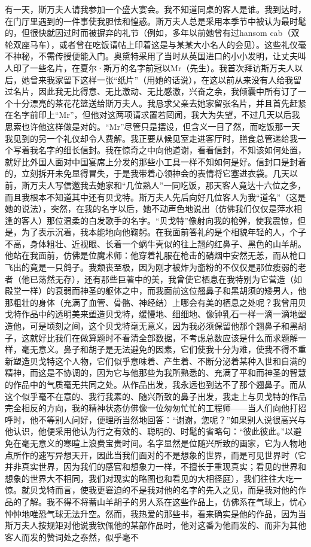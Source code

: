 \par 有一天，斯万夫人请我参加一个盛大宴会。我不知道同桌的客人是谁。我到达时，在门厅里遇到的一件事使我胆怯和惶惑。斯万夫人总是采用本季节中被认为最时髦的，但很快就因过时而被摒弃的礼节（例如，多年以前她曾有过hansom cab（双轮双座马车），或者曾在吃饭请帖上印着这是与某某大小名人的会见）。这些礼仪毫不神秘，不需传授便能入门。奥黛特采用了当时从英国进口的小小发明，让丈夫叫人印了一些名片，在夏尔·斯万的名字前冠以Mr（先生）。我首次拜访斯万夫人以后，她曾来我家留下这样一张“纸片”（用她的话说），在这以前从来没有人给我留过名片，因此我无比得意、无比激动、无比感激，兴奋之余，我倾囊中所有订了一个十分漂亮的茶花花篮送给斯万夫人。我恳求父亲去她家留张名片，并且首先赶紧在名字前印上“Mr”，但他对这两项请求置若罔闻，我大为失望，不过几天以后我思索也许他这样做是对的。“Mr”尽管只是摆设，但含义一目了然，而吃饭那一天我见到的另一个礼仪却令人费解。我正要从候见室走进客厅时，膳食总管递给我一个写着我名字的细长信封。我在惊奇之中向他道谢，看看信封，不知该如何处置，就好比外国人面对中国宴席上分发的那些小工具一样不知如何是好。信封口是封着的，立刻拆开未免显得冒失，于是我带着心领神会的表情将它塞进衣袋。几天以前，斯万夫人写信邀我去她家和“几位熟人”一同吃饭，那天客人竟达十六位之多，而且我根本不知道其中还有贝戈特。斯万夫人先后向好几位客人为我“道名”（这是她的说法），突然，在我的名字以后，她不动声色地说出（仿佛我们仅仅是萍水相逢的客人）那位温柔的白发歌手的名字。“贝戈特”像射向我的枪弹，使我震惊，但是，为了表示沉着，我本能地向他鞠躬。在我面前答礼的是个相貌年轻的人，个子不高，身体粗壮、近视眼、长着一个蜗牛壳似的往上翘的红鼻子、黑色的山羊胡。他站在我面前，仿佛是位魔术师：他穿着礼服在枪击的硝烟中安然无恙，而从枪口飞出的竟是一只鸽子。我颓丧至极，因为刚才被炸为齑粉的不仅仅是那位瘦弱的老者（他已荡然无存），还有那些巨著中的美，我曾使它栖息在我特别为它营造（如殿堂一样）的衰弱而神圣的躯体之中，而我面前这位翘鼻子和黑胡须的矮男人，他那粗壮的身体（充满了血管、骨骼、神经结）上哪会有美的栖息之处呢？我曾用贝戈特作品中的透明美来塑造贝戈特，缓慢地、细细地、像钟乳石一样一滴一滴地塑造他，可是顷刻之间，这个贝戈特毫无意义，因为我必须保留他那个翘鼻子和黑胡子，这就好比我们在做算题时不看清全部数据，不考虑总数应该是什么而求题解一样，毫无意义。鼻子和胡子是无法避免的因素，它们使我十分为难，使我不得不重新塑造贝戈特这个人物，它们似乎意味着、产生着、不断分泌着某种入世和自满的精神，而这是不协调的，因为它与他那些为我所熟悉的、充满了平和而神圣的智慧的作品中的气质毫无共同之处。从作品出发，我永远也到达不了那个翘鼻子。而从这个似乎毫不在意的、我行我素的、随兴所致的鼻子出发，我走上与贝戈特的作品完全相反的方向，我的精神状态仿佛像一位匆匆忙忙的工程师——当人们向他打招呼时，他不等别人问好，便理所当然地回答：“谢谢，您呢？”如果别人说很高兴与他认识，他便采用他认为行之有效的、聪明的、时髦的省略句：“彼此彼此。”以避免在毫无意义的寒暄上浪费宝贵时间。名字显然是位随兴所致的画家，它为人物地点所作的速写异想天开，因此当我们面对的不是想象的世界，而是可见世界时（它并非真实世界，因为我们的感官和想象力一样，不擅长于重现真实；看见的世界和想象的世界大不相同，我们对现实的略图也和看见的大相径庭），我们往往大吃一惊。就贝戈特而言，使我更窘迫的不是我对他的名字的先入之见，而是我对他的作品的了解。我不得不将蓄山羊胡子的男人系在这些作品上，仿佛系在气球上，忧心忡忡地唯恐气球无法升空。然而，我热爱的那些书，看来确实是他的作品，因为当斯万夫人按规矩对他说我钦佩他的某部作品时，他对这番为他而发的、而非为其他客人而发的赞词处之泰然，似乎毫不
